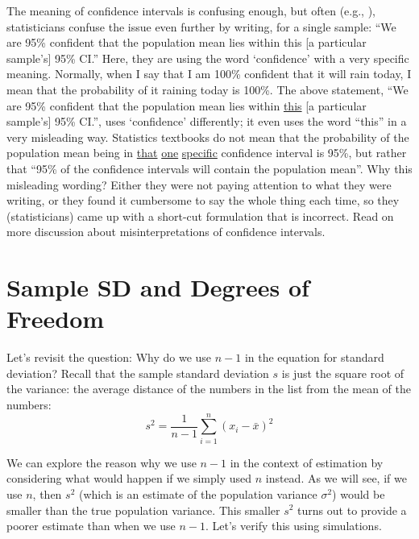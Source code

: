 \documentclass[12pt]{book}\usepackage[]{graphicx}\usepackage[]{color}
\begin{document}
The meaning of confidence intervals is confusing enough,
but often (e.g., \cite{mooreetal}), statisticians confuse the issue even further by writing, for a single sample: ``We are 95\% confident that the population mean lies within this [a particular sample's] 95\% CI.'' Here, they are using the word `confidence' with a very specific meaning. Normally, when I say that I am 100\% confident that it will rain today, I mean that the probability of it raining today is 100\%. The above statement, ``We are 95\% confident that the population mean lies within \underline{this} [a particular sample's] 95\% CI.'', uses `confidence' differently; it even uses the word ``this'' in a very misleading way.
Statistics textbooks do not mean that the probability of the population mean being in \underline{that} \underline{one} \underline{specific} confidence interval is 95\%, but rather that ``95\% of the confidence intervals will contain the population mean''. Why this misleading wording? Either they were not paying attention to what they were writing, or they found it cumbersome to say the whole thing each time, so they (statisticians) came up with a short-cut formulation that is incorrect.  Read \cite{hoekstra2014robust} on more discussion about misinterpretations of confidence intervals.

\section{Sample SD and Degrees of Freedom} \label{ch3nminusone}

Let's revisit the question: Why do we use $n-1$ in the
equation for standard deviation?  
Recall that the sample standard deviation $s$ is just the square root of the variance:
the average distance of the numbers in the list from the mean of the
numbers:
\begin{equation} 
s^2 = \frac{1}{n-1} \underset{i=1}{\overset{n}{\sum}}(x_i - \bar{x})^2  \label{nminusone}
\end{equation}

We can explore the reason why we use $n-1$ in the context of
estimation by considering what would happen 
if we simply used $n$ instead. As we will see, if we use $n$, then $s^2$
(which is an estimate of the population variance $\sigma^2$) would be
smaller than the true population variance. This smaller $s^2$ turns out to provide a poorer estimate than
when we use $n-1$. Let's verify this using simulations.
\end{document}
